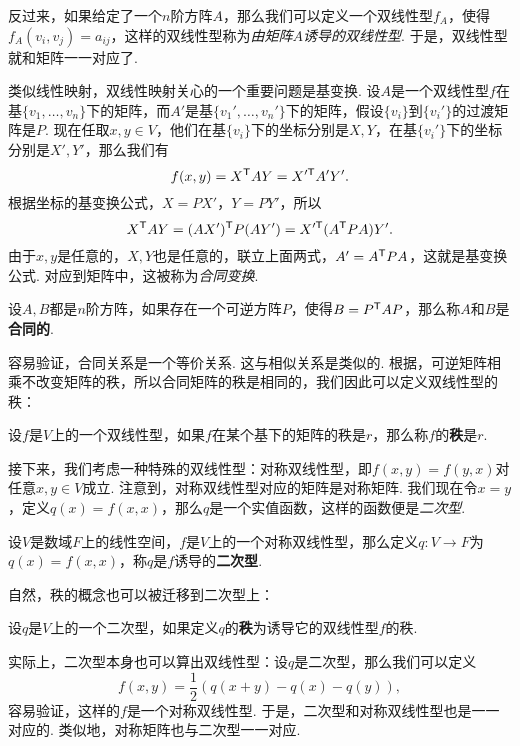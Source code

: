 反过来，如果给定了一个$n$阶方阵$A$，那么我们可以定义一个双线性型$f_A$，使得$f_A(v_i,v_j)=a_{ij}$，这样的双线性型称为\emph{由矩阵$A$诱导的双线性型}. 于是，双线性型就和矩阵一一对应了. 

类似线性映射，双线性映射关心的一个重要问题是基变换. 设$A$是一个双线性型$f$在基$\{v_1,\dots,v_n\}$下的矩阵，而$A'$是基$\{v_1',\dots,v_n'\}$下的矩阵，假设$\{v_i\}$到$\{v_i'\}$的过渡矩阵是$P$. 现在任取$x,y\in V$，他们在基$\{v_i\}$下的坐标分别是$X,Y$，在基$\{v_i'\}$下的坐标分别是$X',Y'$，那么我们有
\[
    f(x,y)=X^{\mathsf{T}} AY=X'^{\mathsf{T}} A'Y'.
\]
根据坐标的基变换公式，$X=PX'$，$Y=PY'$，所以
\[
    X^{\mathsf{T}} AY=(AX')^{\mathsf{T}} P(AY')=X'^{\mathsf{T}} (A^{\mathsf{T}} P A)Y'.
\]
由于$x,y$是任意的，$X,Y$也是任意的，联立上面两式，$A'=A^{\mathsf{T}} P A$，这就是基变换公式. 对应到矩阵中，这被称为\emph{合同变换}. 

\begin{definition}[合同矩阵]\label{def:congruent-matrix}
    设$A,B$都是$n$阶方阵，如果存在一个可逆方阵$P$，使得$B=P^{\mathsf{T}} A P$，那么称$A$和$B$是\textbf{合同的}. 
\end{definition}
容易验证，合同关系是一个等价关系. 这与相似关系是类似的. 根据，可逆矩阵相乘不改变矩阵的秩，所以合同矩阵的秩是相同的，我们因此可以定义双线性型的秩：

\begin{definition}[双线性型的秩]\label{def:bilinear-form-rank}
    设$f$是$V$上的一个双线性型，如果$f$在某个基下的矩阵的秩是$r$，那么称$f$的\textbf{秩}是$r$.
\end{definition}

接下来，我们考虑一种特殊的双线性型：对称双线性型，即$f(x,y)=f(y,x)$对任意$x,y\in V$成立. 注意到，对称双线性型对应的矩阵是对称矩阵. 我们现在令$x=y$，定义$q(x)=f(x,x)$，那么$q$是一个实值函数，这样的函数便是\emph{二次型}. 

\begin{definition}[二次型]\label{def:quadratic-form}
    设$V$是数域$F$上的线性空间，$f$是$V$上的一个对称双线性型，那么定义$q:V\to F$为$q(x)=f(x,x)$，称$q$是$f$诱导的\textbf{二次型}. 
\end{definition}

自然，秩的概念也可以被迁移到二次型上：
\begin{definition}[二次型的秩]\label{def:quadratic-form-rank}
设$q$是$V$上的一个二次型，如果定义$q$的\textbf{秩}为诱导它的双线性型$f$的秩. 
\end{definition}

实际上，二次型本身也可以算出双线性型：设$q$是二次型，那么我们可以定义
\[f(x,y)=\frac{1}{2}(q(x+y)-q(x)-q(y)),\]
容易验证，这样的$f$是一个对称双线性型. 于是，二次型和对称双线性型也是一一对应的. 类似地，对称矩阵也与二次型一一对应. 

